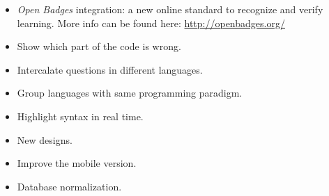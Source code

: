 \begin{itemize}
\item \textit{Open Badges} integration: a new online standard to recognize and verify learning. More info can be found here: \url{http://openbadges.org/}

\item Show which part of the code is wrong.

\item Intercalate questions in different languages.

\item Group languages with same programming paradigm.

\item Highlight syntax in real time.

\item New designs.

\item Improve the mobile version.

\item Database normalization.

\end{itemize}